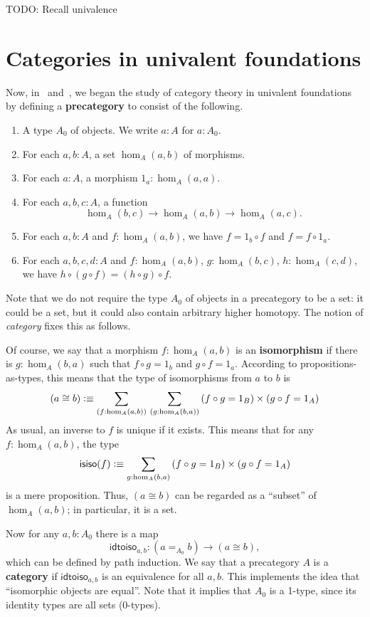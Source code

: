 \documentclass{amsart}
\begin{document}
TODO: Recall univalence

\section{Categories in univalent foundations}
\label{sec:cat-uf}

Now, in~\cite{aks:rezk} and~\cite[Chapter 9]{hottbook}, we began the study of category theory in univalent foundations by defining a \textbf{precategory} to consist of the following.
\begin{enumerate}
\item A type $A_0$ of objects.  We write $a:A$ for $a:A_0$.
\item For each $a,b:A$, a set $\hom_A(a,b)$ of {morphisms}.
\item For each $a:A$, a morphism $1_a:\hom_A(a,a)$.
\item For each $a,b,c:A$, a function
  \[  \hom_A(b,c) \to \hom_A(a,b) \to \hom_A(a,c). \]
\item For each $a,b:A$ and $f:\hom_A(a,b)$, we have $f = {1_b\circ f}$ and $f = {f\circ 1_a}$.
\item For each $a,b,c,d:A$ and $f:\hom_A(a,b)$, $g:\hom_A(b,c)$, $h:\hom_A(c,d)$, we have ${h\circ (g\circ f)} ={(h\circ g)\circ f}$.
\end{enumerate}
Note that we do not require the type $A_0$ of objects in a precategory to be a set: it could be a set, but it could also contain arbitrary higher homotopy.
The notion of \emph{category} fixes this as follows.

Of course, we say that a morphism $f:\hom_A(a,b)$ is an \textbf{isomorphism} if there is $g:\hom_A(b,a)$ such that $f\circ g = 1_b$ and $g\circ f = 1_a$.
According to propositions-as-types, this means that the type of isomorphisms from $a$ to $b$ is
\[ (a\cong b) \defeq \sm{f:\hom_A(a,b)}{g:\hom_A(b,a)} (f\circ g = 1_B) \times (g\circ f = 1_A) \]
As usual, an inverse to $f$ is unique if it exists.
This means that for any $f:\hom_A(a,b)$, the type
\[ \mathsf{isiso}(f) \defeq \sm{g:\hom_A(b,a)} (f\circ g = 1_B) \times (g\circ f = 1_A)  \]
is a mere proposition.
Thus, $(a\cong b)$ can be regarded as a ``subset'' of $\hom_A(a,b)$; in particular, it is a set.

Now for any $a,b:A_0$ there is a map
\[\mathsf{idtoiso}_{a,b}:(a=_{A_0} b) \to (a\cong b),\]
which can be defined by path induction.
We say that a precategory $A$ is a \textbf{category} if $\mathsf{idtoiso}_{a,b}$ is an equivalence for all $a,b$.
This implements the idea that ``isomorphic objects are equal''.
Note that it implies that $A_0$ is a 1-type, since its identity types are all sets (0-types).
\end{document}
